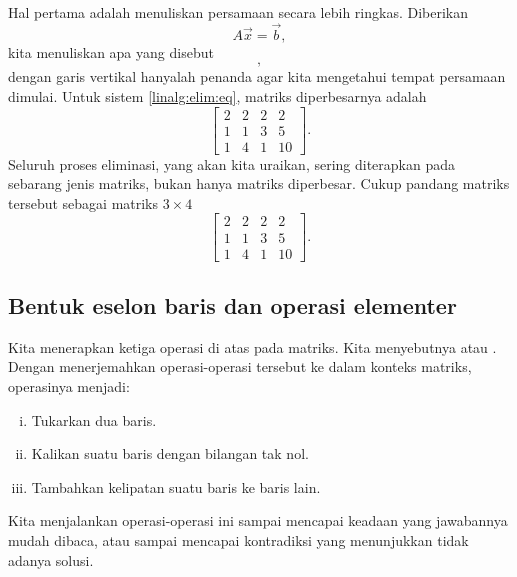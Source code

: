 Hal pertama adalah menuliskan persamaan secara lebih ringkas. Diberikan
\begin{equation*}
A \vec{x} = \vec{b} ,
\end{equation*}
kita menuliskan apa yang disebut \emph{}
\begin{equation*}
[ A ~|~ \vec{b} ] ,
\end{equation*}
dengan garis vertikal hanyalah penanda agar kita mengetahui tempat
 persamaan dimulai.
Untuk sistem \eqref{linalg:elim:eq}, matriks diperbesarnya adalah
\begin{equation*}
\left[
\begin{array}{ccc|c}
2 & 2 & 2 & 2 \\
1 & 1 & 3 & 5 \\
1 & 4 & 1 & 10
\end{array}
\right] .
\end{equation*}
Seluruh proses eliminasi, yang akan kita uraikan,
sering diterapkan pada sebarang jenis matriks,
bukan hanya
matriks diperbesar.
Cukup pandang matriks tersebut sebagai matriks $3 \times 4$
\begin{equation*}
\begin{bmatrix}
2 & 2 & 2 & 2 \\
1 & 1 & 3 & 5 \\
1 & 4 & 1 & 10
\end{bmatrix} .
\end{equation*}

\subsection{Bentuk eselon baris dan operasi elementer}

Kita menerapkan ketiga operasi di atas pada matriks. Kita menyebutnya
\emph{} atau
\emph{}.
Dengan menerjemahkan operasi-operasi tersebut ke dalam konteks matriks,
operasinya menjadi:
\begin{enumerate}[(i)]
\item Tukarkan dua baris.
\item Kalikan suatu baris dengan bilangan tak nol.
\item Tambahkan kelipatan suatu baris ke baris lain.
\end{enumerate}
\pagebreak[2]
Kita menjalankan operasi-operasi ini sampai
mencapai keadaan yang jawabannya mudah dibaca,
atau sampai mencapai kontradiksi yang menunjukkan tidak adanya solusi.

